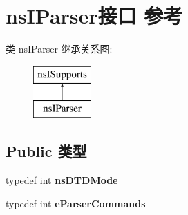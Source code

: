 \hypertarget{interfacens_i_parser}{}\section{ns\+I\+Parser接口 参考}
\label{interfacens_i_parser}
类 ns\+I\+Parser 继承关系图\+:\begin{figure}[H]
\begin{center}
\leavevmode
\includegraphics[height=2.000000cm]{interfacens_i_parser}
\end{center}
\end{figure}
\subsection*{Public 类型}
\begin{DoxyCompactItemize}
\item 
\mbox{\label{interfacens_i_parser_a5b2f46f05b22de7f24c31e0e9a39cc3f}} 
typedef int {\bfseries ns\+D\+T\+D\+Mode}
\item 
\mbox{\label{interfacens_i_parser_a527af21341be6b7eaf81b3f871031587}} 
typedef int {\bfseries e\+Parser\+Commands}
\end{DoxyCompactItemize}
